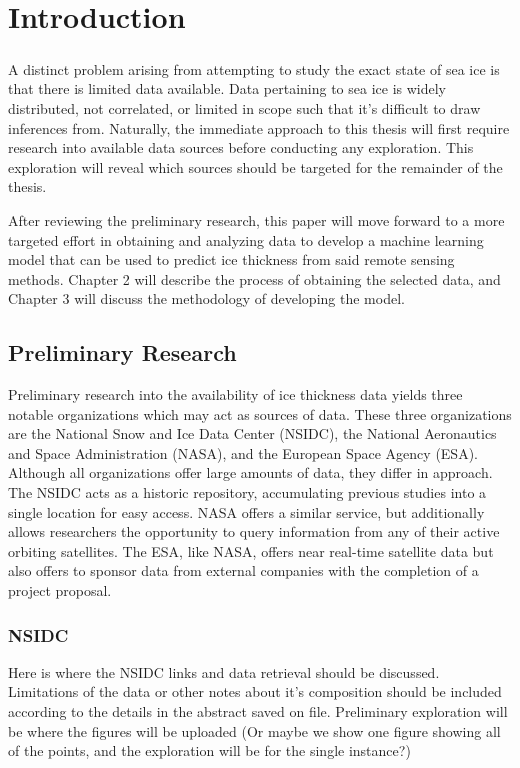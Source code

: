 \chapter{Introduction}
\label{sec:Introduction}

\paragraph{}
A distinct problem arising from attempting to study the exact state of sea ice is that there is limited data available. Data pertaining to sea ice is widely distributed, not correlated, or limited in scope such that it's difficult to draw inferences from. Naturally, the immediate approach to this thesis will first require research into available data sources before conducting any exploration. This exploration will reveal which sources should be targeted for the remainder of the thesis.

\indent After reviewing the preliminary research, this paper will move forward to a more targeted effort in obtaining and analyzing data to develop a machine learning model that can be used to predict ice thickness from said remote sensing methods. Chapter 2 will describe the process of obtaining the selected data, and Chapter 3 will discuss the methodology of developing the model.
\par

\section{Preliminary Research}
Preliminary research into the availability of ice thickness data yields three notable organizations which may act as sources of data. These three organizations are the National Snow and Ice Data Center (NSIDC), the National Aeronautics and Space Administration (NASA), and the European Space Agency (ESA). Although all organizations offer large amounts of data, they differ in approach. The NSIDC acts as a historic repository, accumulating previous studies into a single location for easy access. NASA offers a similar service, but additionally allows researchers the opportunity to query information from any of their active orbiting satellites. The ESA, like NASA, offers near real-time satellite data but also offers to sponsor data from external companies with the completion of a project proposal.

\subsection*{NSIDC}
Here is where the NSIDC links and data retrieval should be discussed. Limitations of the data or other notes about it's composition should be included according to the details in the abstract saved on file. Preliminary exploration will be where the figures will be uploaded (Or maybe we show one figure showing all of the points, and the exploration will be for the single instance?)

